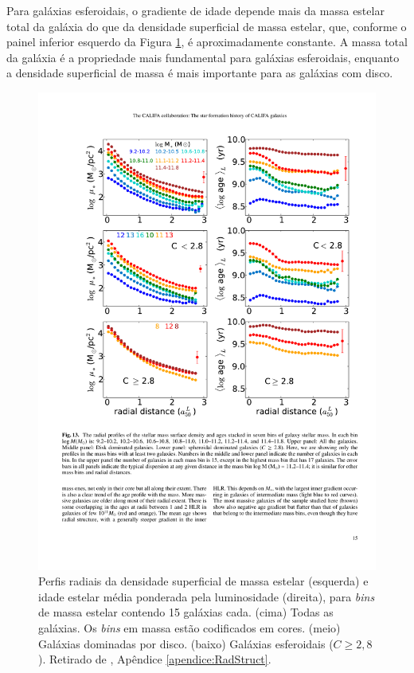 Para galáxias esferoidais, o gradiente de idade depende mais da massa estelar
total da galáxia do que da densidade superficial de massa estelar, que, conforme
o painel inferior esquerdo da Figura \ref{fig:radStruct3}, é aproximadamente
constante. A massa total da galáxia é a propriedade mais fundamental para
galáxias esferoidais, enquanto a densidade superficial de massa é mais
importante para as galáxias com disco.


\begin{figure}
	\includegraphics[width=0.8\columnwidth]{figuras/radstruct-03}
	\caption[Perfis radiais para vários {\em bins} de massa estelar.]
	{Perfis radiais da densidade superficial de massa estelar (esquerda) e idade
	estelar média ponderada pela luminosidade (direita), para {\em bins} de
	massa estelar contendo 15 galáxias cada. (cima) Todas as galáxias. Os {\em
	bins} em massa estão codificados em cores. (meio) Galáxias dominadas por
	disco. (baixo) Galáxias esferoidais ($C \geq 2,8$). Retirado de \cite[figura
	13]{GonzalezDelgado2013}, Apêndice \ref{apendice:RadStruct}.}
	\label{fig:radStruct3}
\end{figure}


